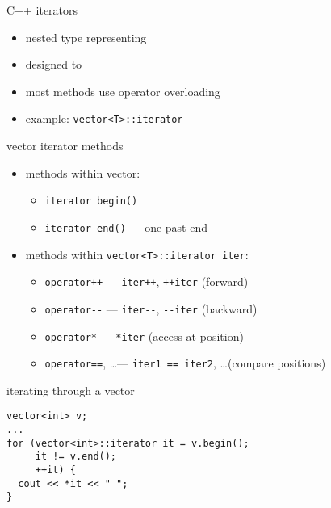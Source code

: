 \begin{frame}{C++ iterators}
    \begin{itemize}
        \item nested type representing 
        \item designed to 
        \item most methods use operator overloading
        \item example: \texttt{vector<T>::iterator}
    \end{itemize}
\end{frame}

\begin{frame}[fragile,label=itMethods]{vector iterator methods}
\lstset{
    language=C++,
    style=smaller,
}
\begin{itemize}
\item methods within vector:
    \begin{itemize}
    \item \lstinline|iterator begin()|
    \item \lstinline|iterator end()| --- one past end
    \end{itemize}
\item methods within \lstinline|vector<T>::iterator iter|:
    \begin{itemize}
        \item \lstinline|operator++| --- \lstinline|iter++|, \lstinline|++iter| (forward)
    \item \lstinline|operator--| --- \lstinline|iter--|, \lstinline|--iter| (backward)
                \item \lstinline|operator*| --- \lstinline|*iter| (access at position)
                \item \lstinline|operator==|, \ldots --- \lstinline|iter1 == iter2|, \ldots (compare positions)
    \end{itemize}
\end{itemize}
\end{frame}

\begin{frame}[fragile,label=itInVector]{iterating through a vector}
\lstset{
    language=C++,
    style=small
}
\begin{lstlisting}
vector<int> v;
...
for (vector<int>::iterator it = v.begin();
     it != v.end();
     ++it) {
  cout << *it << " ";
}
\end{lstlisting}
\end{frame}

